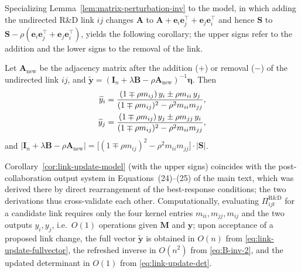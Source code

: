 Specializing Lemma~\ref{lem:matrix-perturbation-inv} to the model, in
which adding the undirected R\&D link $ij$ changes $\mathbf{A}$ to
$\mathbf{A} + \mathbf{e}_i \mathbf{e}_j^\top + \mathbf{e}_j
\mathbf{e}_i^\top$ and hence $\mathbf{S}$ to $\mathbf{S} - \rho (
\mathbf{e}_i \mathbf{e}_j^\top + \mathbf{e}_j \mathbf{e}_i^\top )$,
yields the following corollary; the upper signs refer to the addition
and the lower signs to the removal of the link.

\begin{corollary}
Let $\mathbf{A}_{\mathrm{new}}$ be the adjacency matrix after the
addition ($+$) or removal ($-$) of the undirected link $ij$, and
$\widetilde{\mathbf{y}} = (\mathbf{I}_n + \lambda \mathbf{B} - \rho
\mathbf{A}_{\mathrm{new}})^{-1} \bm{\eta}$. Then
\begin{align}
\widetilde{y}_i
& =
\frac{(1 \mp \rho m_{ij})\, y_i \pm \rho m_{ii}\, y_j}
{(1 \mp \rho m_{ij})^2 - \rho^2 m_{ii} m_{jj}}, \notag \\
\widetilde{y}_j
& =
\frac{(1 \mp \rho m_{ij})\, y_j \pm \rho m_{jj}\, y_i}
{(1 \mp \rho m_{ij})^2 - \rho^2 m_{ii} m_{jj}},
\label{eq:link-update-model}
\end{align}
and
$| \mathbf{I}_n + \lambda \mathbf{B} - \rho \mathbf{A}_{\mathrm{new}} |
= \bigl[ (1 \mp \rho m_{ij})^2 - \rho^2 m_{ii} m_{jj} \bigr] \cdot
| \mathbf{S} |$.
\label{cor:link-update-model}
\end{corollary}

Corollary~\ref{cor:link-update-model} (with the upper signs) coincides
with the post-collaboration output system in Equations~(24)--(25) of the
main text, which was derived there by direct rearrangement of the
best-response conditions; the two derivations thus cross-validate each
other. Computationally, evaluating
$\Pi^{\mathrm{R\&D}}_{ijt}$ for a candidate link requires only the four
kernel entries $m_{ii}, m_{jj}, m_{ij}$ and the two outputs $y_i, y_j$,
i.e.\ $O(1)$ operations given $\mathbf{M}$ and $\mathbf{y}$; upon
acceptance of a proposed link change, the full vector
$\widetilde{\mathbf{y}}$ is obtained in $O(n)$ from
\eqref{eq:link-update-fullvector}, the refreshed inverse in $O(n^2)$
from \eqref{eq:B-inv-2}, and the updated determinant in $O(1)$ from
\eqref{eq:link-update-det}.


